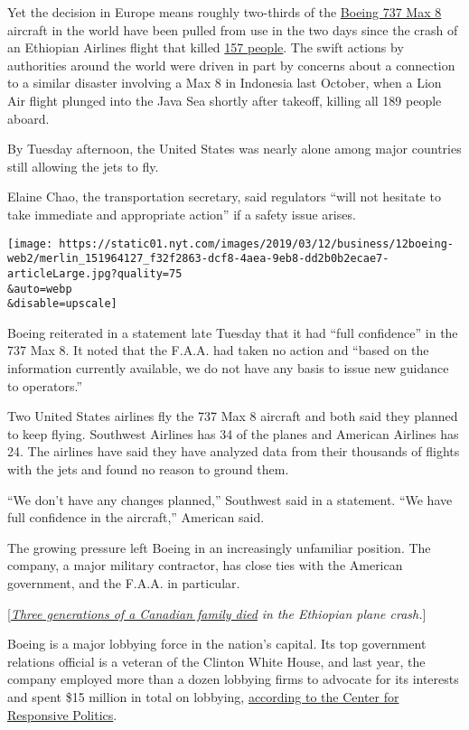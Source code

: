 Yet the decision in Europe means roughly two-thirds of the
\href{https://www.nytimes.com/2019/03/13/business/china-boeing.html}{Boeing
737 Max 8} aircraft in the world have been pulled from use in the two
days since the crash of an Ethiopian Airlines flight that killed
\href{https://www.nytimes.com/2019/03/10/world/africa/ethiopian-airlines-plane-crash-victims.html?module=inline}{157
people}. The swift actions by authorities around the world were driven
in part by concerns about a connection to a similar disaster involving a
Max 8 in Indonesia last October, when a Lion Air flight plunged into the
Java Sea shortly after takeoff, killing all 189 people aboard.

By Tuesday afternoon, the United States was nearly alone among major
countries still allowing the jets to fly.

Elaine Chao, the transportation secretary, said regulators ``will not
hesitate to take immediate and appropriate action'' if a safety issue
arises.

\texttt{[image: https://static01.nyt.com/images/2019/03/12/business/12boeing-web2/merlin\_151964127\_f32f2863-dcf8-4aea-9eb8-dd2b0b2ecae7-articleLarge.jpg?quality=75\\\&auto=webp\\\&disable=upscale]}

Boeing reiterated in a statement late Tuesday that it had ``full
confidence'' in the 737 Max 8. It noted that the F.A.A. had taken no
action and ``based on the information currently available, we do not
have any basis to issue new guidance to operators.''

Two United States airlines fly the 737 Max 8 aircraft and both said they
planned to keep flying. Southwest Airlines has 34 of the planes and
American Airlines has 24. The airlines have said they have analyzed data
from their thousands of flights with the jets and found no reason to
ground them.

``We don't have any changes planned,'' Southwest said in a statement.
``We have full confidence in the aircraft,'' American said.

The growing pressure left Boeing in an increasingly unfamiliar position.
The company, a major military contractor, has close ties with the
American government, and the F.A.A. in particular.

{[}\href{https://www.nytimes.com/2019/03/12/world/canada/ethiopian-plane-crash-canadian-families.html}{\emph{Three
generations of a Canadian family died}} \emph{in the Ethiopian plane
crash.}{]}

Boeing is a major lobbying force in the nation's capital. Its top
government relations official is a veteran of the Clinton White House,
and last year, the company employed more than a dozen lobbying firms to
advocate for its interests and spent \$15 million in total on lobbying,
\href{https://www.opensecrets.org/lobby/clientsum.php?id=D000000100}{according
to the Center for Responsive Politics}.

